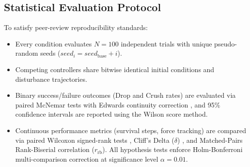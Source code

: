 \subsection{Statistical Evaluation Protocol}
To satisfy peer-review reproducibility standards:
\begin{itemize}
    \item Every condition evaluates $N = 100$ independent trials with unique pseudo-random seeds ($seed_i = seed_{\text{base}} + i$).
    \item Competing controllers share bitwise identical initial conditions and disturbance trajectories.
    \item Binary success/failure outcomes (Drop and Crush rates) are evaluated via paired McNemar tests with Edwards continuity correction \cite{mcnemar1947note}, and 95\% confidence intervals are reported using the Wilson score method.
    \item Continuous performance metrics (survival steps, force tracking) are compared via paired Wilcoxon signed-rank tests \cite{wilcoxon1945individual}, Cliff's Delta ($\delta$) \cite{cliffs1993dominance}, and Matched-Pairs Rank-Biserial correlation ($r_{\text{rb}}$). All hypothesis tests enforce Holm-Bonferroni multi-comparison correction at significance level $\alpha = 0.01$.
\end{itemize}

